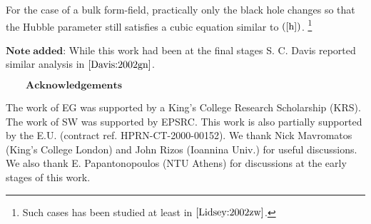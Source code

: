 \documentclass[a4paper,a4paper]{article}
\begin{document}
For the case of a bulk form-field, practically only the black hole changes so
that the Hubble parameter
still satisfies a cubic equation similar to $(\ref{h})$. 
\footnote{Such cases has been studied
at least in $\cite{Lidsey:2002zw}$.}

$\mathbf {Note \; added}$: While this work had been at the final stages S. C. Davis
reported similar analysis in $\cite{Davis:2002gn}$. 

$\mathbf{ \qquad Acknowledgements}$

The work of EG was supported by a King's College Research Scholarship (KRS). The
work of SW was supported by EPSRC. This work is also partially supported
by the E.U. (contract ref. HPRN-CT-2000-00152). We thank Nick Mavromatos (King's College London)
and John Rizos (Ioannina Univ.) for useful
discussions.
We also thank 
E. Papantonopoulos (NTU Athens) for
discussions at the early stages of this work.
\end{document}
